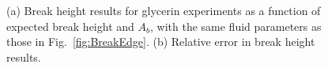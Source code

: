 \documentclass{jfm}
\begin{document}
\begin{figure}
\centering
{}
\caption{(a) Break height results for glycerin experiments as a function of expected break height and $A_b$, with the same fluid parameters as those in Fig.~\ref{fig:BreakEdge}. (b) Relative error in break height results.}
\label{fig:BreakHeightGlycerin}
\end{figure}
\end{document}

